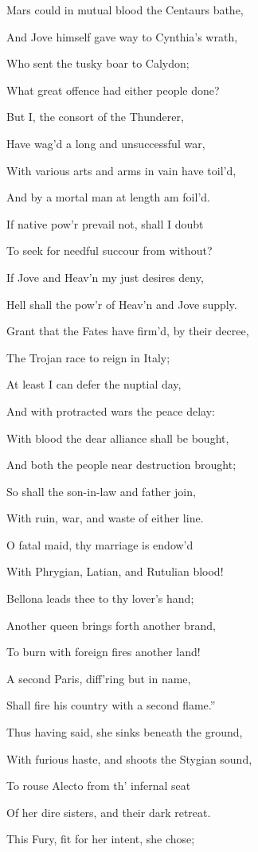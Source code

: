 Mars could in mutual blood the Centaurs bathe,

And Jove himself gave way to Cynthia’s wrath,

Who sent the tusky boar to Calydon;

What great offence had either people done?

But I, the consort of the Thunderer,

Have wag’d a long and unsuccessful war,

With various arts and arms in vain have toil’d,

And by a mortal man at length am foil’d.

If native pow’r prevail not, shall I doubt

To seek for needful succour from without?

If Jove and Heav’n my just desires deny,

Hell shall the pow’r of Heav’n and Jove supply.

Grant that the Fates have firm’d, by their decree,

The Trojan race to reign in Italy;

At least I can defer the nuptial day,

And with protracted wars the peace delay:

With blood the dear alliance shall be bought,

And both the people near destruction brought;

So shall the son-in-law and father join,

With ruin, war, and waste of either line.

O fatal maid, thy marriage is endow’d

With Phrygian, Latian, and Rutulian blood!

Bellona leads thee to thy lover’s hand;

Another queen brings forth another brand,

To burn with foreign fires another land!

A second Paris, diff’ring but in name,

Shall fire his country with a second flame.”

Thus having said, she sinks beneath the ground,

With furious haste, and shoots the Stygian sound,

To rouse Alecto from th’ infernal seat

Of her dire sisters, and their dark retreat.

This Fury, fit for her intent, she chose;

